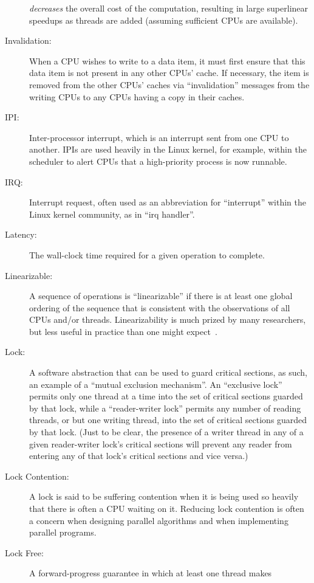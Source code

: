 \begin{description}
	\emph{decreases} the overall cost of the computation, resulting in
	large superlinear speedups as threads are added (assuming sufficient
	CPUs are available).
\item[Invalidation:]
	When a CPU wishes to write to a data item, it must first ensure
	that this data item is not present in any other CPUs' cache.
	If necessary, the item is removed from the other CPUs' caches
	via ``invalidation'' messages from the writing CPUs to any
	CPUs having a copy in their caches.
\item[IPI:]
	Inter-processor interrupt, which is an
	interrupt sent from one CPU to another.
	IPIs are used heavily in the Linux kernel, for example, within
	the scheduler to alert CPUs that a high-priority process is now
	runnable.
\item[IRQ:]
	Interrupt request, often used as an abbreviation for ``interrupt''
	within the Linux kernel community, as in ``irq handler''.
\item[Latency:]
	The wall-clock time required for a given operation to complete.
\item[Linearizable:]
	A sequence of operations is ``linearizable'' if there is at
	least one global ordering of the sequence that is consistent
	with the observations of all CPUs and/or threads.
	Linearizability is much prized by many researchers, but less
	useful in practice than one might
	expect~\cite{AndreasHaas2012FIFOisnt}.
\item[Lock:]
	A software abstraction that can be used to guard critical sections,
	as such, an example of a ``mutual exclusion mechanism''.
	An ``exclusive lock'' permits only one thread at a time into the
	set of critical sections guarded by that lock, while a
	``reader-writer lock'' permits any number of reading
	threads, or but one writing thread, into the set of critical
	sections guarded by that lock.  (Just to be clear, the presence
	of a writer thread in any of a given reader-writer lock's
	critical sections will prevent any reader from entering
	any of that lock's critical sections and vice versa.)
\item[Lock Contention:]
	A lock is said to be suffering contention when it is being
	used so heavily that there is often a CPU waiting on it.
	Reducing lock contention is often a concern when designing
	parallel algorithms and when implementing parallel programs.
\item[Lock Free:]
	A forward-progress guarantee in which at least one thread makes

\end{description}
